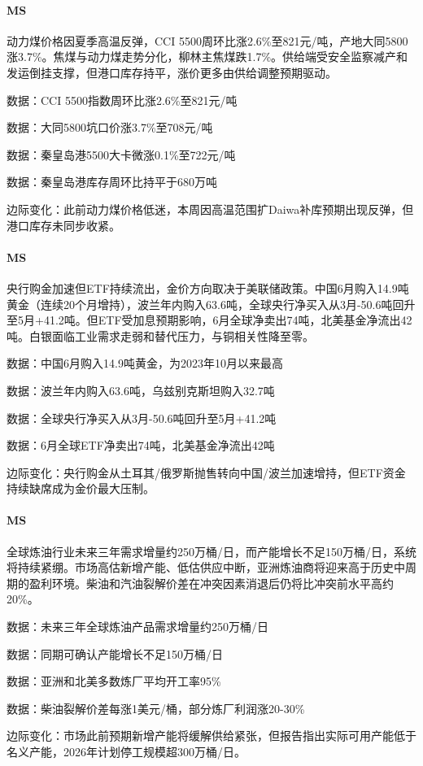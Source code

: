 \documentclass[11pt]{ctexart}
\begin{document}
\paragraph{MS} 动力煤价格因夏季高温反弹，CCI 5500周环比涨2.6\%至821元/吨，产地大同5800涨3.7\%。焦煤与动力煤走势分化，柳林主焦煤跌1.7\%。供给端受安全监察减产和发运倒挂支撑，但港口库存持平，涨价更多由供给调整预期驱动。
{\small\color{refgray}数据：CCI 5500指数周环比涨2.6\%至821元/吨\par}
{\small\color{refgray}数据：大同5800坑口价涨3.7\%至708元/吨\par}
{\small\color{refgray}数据：秦皇岛港5500大卡微涨0.1\%至722元/吨\par}
{\small\color{refgray}数据：秦皇岛港库存周环比持平于680万吨\par}
{\small\color{refgray}边际变化：此前动力煤价格低迷，本周因高温范围扩Daiwa补库预期出现反弹，但港口库存未同步收紧。\par}
\paragraph{MS} 央行购金加速但ETF持续流出，金价方向取决于美联储政策。中国6月购入14.9吨黄金（连续20个月增持），波兰年内购入63.6吨，全球央行净买入从3月-50.6吨回升至5月+41.2吨。但ETF受加息预期影响，6月全球净卖出74吨，北美基金净流出42吨。白银面临工业需求走弱和替代压力，与铜相关性降至零。
{\small\color{refgray}数据：中国6月购入14.9吨黄金，为2023年10月以来最高\par}
{\small\color{refgray}数据：波兰年内购入63.6吨，乌兹别克斯坦购入32.7吨\par}
{\small\color{refgray}数据：全球央行净买入从3月-50.6吨回升至5月+41.2吨\par}
{\small\color{refgray}数据：6月全球ETF净卖出74吨，北美基金净流出42吨\par}
{\small\color{refgray}边际变化：央行购金从土耳其/俄罗斯抛售转向中国/波兰加速增持，但ETF资金持续缺席成为金价最大压制。\par}
\paragraph{MS} 全球炼油行业未来三年需求增量约250万桶/日，而产能增长不足150万桶/日，系统将持续紧绷。市场高估新增产能、低估供应中断，亚洲炼油商将迎来高于历史中周期的盈利环境。柴油和汽油裂解价差在冲突因素消退后仍将比冲突前水平高约20\%。
{\small\color{refgray}数据：未来三年全球炼油产品需求增量约250万桶/日\par}
{\small\color{refgray}数据：同期可确认产能增长不足150万桶/日\par}
{\small\color{refgray}数据：亚洲和北美多数炼厂平均开工率95\%\par}
{\small\color{refgray}数据：柴油裂解价差每涨1美元/桶，部分炼厂利润涨20-30\%\par}
{\small\color{refgray}边际变化：市场此前预期新增产能将缓解供给紧张，但报告指出实际可用产能低于名义产能，2026年计划停工规模超300万桶/日。\par}
\end{document}
